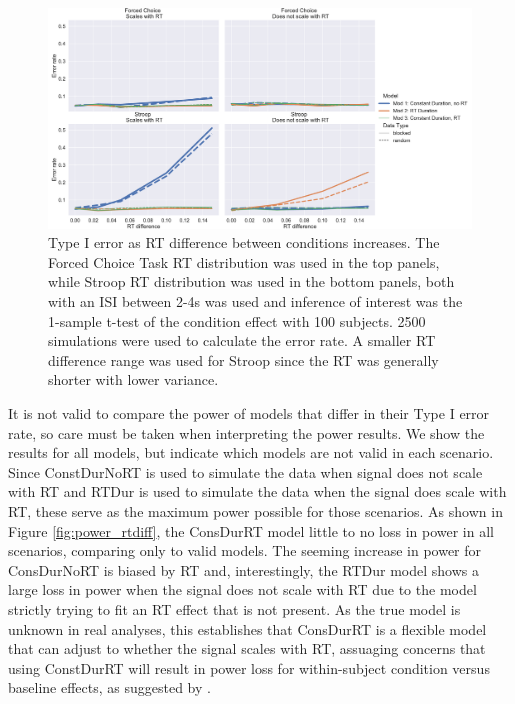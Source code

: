 \documentclass[titlepage,12pt] {article}
\begin{document}
\begin{figure}
  \centering
   \includegraphics[width=5in]{Figures/type1_err_24.pdf}
   \caption{Type I error as RT difference between conditions increases.  The Forced Choice Task RT distribution was used in the top panels, while Stroop RT distribution was used in the bottom panels, both with an ISI between 2-4s was used and inference of interest was the 1-sample t-test of the condition effect with 100 subjects.  2500 simulations were used to calculate the error rate.  A smaller RT difference range was used for Stroop since the RT was generally shorter with lower variance.}
  \label{fig:type1err_24}
\end{figure}


It is not valid to compare the power of models that differ in their Type I error rate, so care must be taken when interpreting the power results.  We show the results for all models, but indicate which models are not valid in each scenario.  Since ConstDurNoRT is used to simulate the data when signal does not scale with RT and RTDur is used to simulate the data when the signal does scale with RT, these serve as the maximum power possible for those scenarios.  As shown in Figure \ref{fig:power_rtdiff}, the ConsDurRT model little to no loss in power in all scenarios, comparing only to valid models.  The seeming increase in power for ConsDurNoRT is biased by RT and, interestingly, the RTDur model shows a large loss in power when the signal does not scale with RT due to the model strictly trying to fit an RT effect that is not present.  As the true model is unknown in real analyses, this establishes that ConsDurRT is a flexible model that can adjust to whether the signal scales with RT,  assuaging concerns that using ConstDurRT will result in power loss for within-subject condition versus baseline effects, as suggested by \citet{grinband_detection_2008}.  
\end{document}
